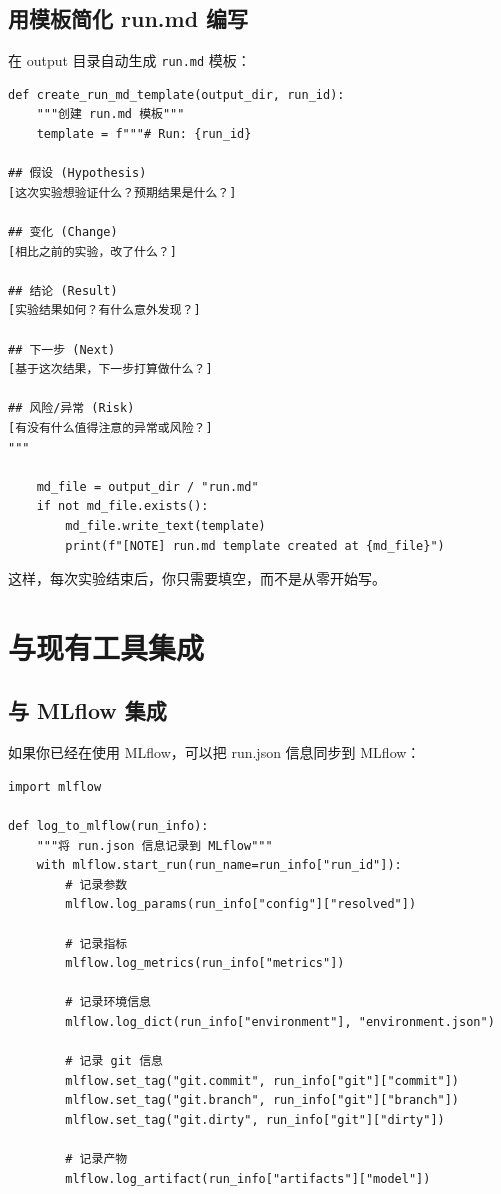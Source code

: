 \subsection{用模板简化 run.md 编写}

在 output 目录自动生成 \texttt{run.md} 模板：

\begin{verbatim}
def create_run_md_template(output_dir, run_id):
    """创建 run.md 模板"""
    template = f"""# Run: {run_id}

## 假设 (Hypothesis)
[这次实验想验证什么？预期结果是什么？]

## 变化 (Change)
[相比之前的实验，改了什么？]

## 结论 (Result)
[实验结果如何？有什么意外发现？]

## 下一步 (Next)
[基于这次结果，下一步打算做什么？]

## 风险/异常 (Risk)
[有没有什么值得注意的异常或风险？]
"""

    md_file = output_dir / "run.md"
    if not md_file.exists():
        md_file.write_text(template)
        print(f"[NOTE] run.md template created at {md_file}")
\end{verbatim}

这样，每次实验结束后，你只需要填空，而不是从零开始写。

\section{与现有工具集成}

\subsection{与 MLflow 集成}

如果你已经在使用 MLflow，可以把 run.json 信息同步到 MLflow：

\begin{verbatim}
import mlflow

def log_to_mlflow(run_info):
    """将 run.json 信息记录到 MLflow"""
    with mlflow.start_run(run_name=run_info["run_id"]):
        # 记录参数
        mlflow.log_params(run_info["config"]["resolved"])

        # 记录指标
        mlflow.log_metrics(run_info["metrics"])

        # 记录环境信息
        mlflow.log_dict(run_info["environment"], "environment.json")

        # 记录 git 信息
        mlflow.set_tag("git.commit", run_info["git"]["commit"])
        mlflow.set_tag("git.branch", run_info["git"]["branch"])
        mlflow.set_tag("git.dirty", run_info["git"]["dirty"])

        # 记录产物
        mlflow.log_artifact(run_info["artifacts"]["model"])
\end{verbatim}

